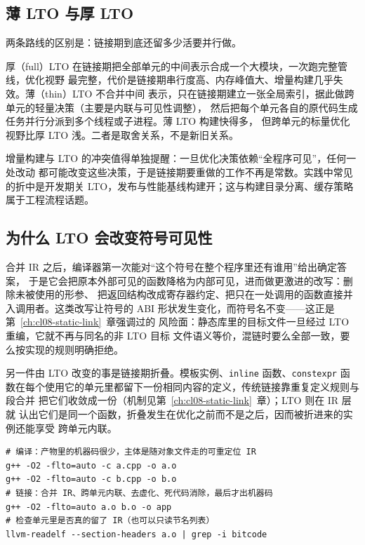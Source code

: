 \documentclass[12pt,a4paper,fontset=fandol]{ctexbook}
\newcommand{\Tp}[1]{\texttt{#1}}
\newcommand{\Mx}[1]{\textsf{#1}}
\begin{document}
\subsection{薄 LTO 与厚 LTO}\label{sec:cl05-thickthin}

两条路线的区别是：链接期到底还留多少活要并行做。

\begin{compare}[title={厚 LTO 与薄 LTO}]
厚（full）LTO 在链接期把全部单元的中间表示合成一个大模块，一次跑完整管线，优化视野
最完整，代价是链接期串行度高、内存峰值大、增量构建几乎失效。薄（thin）LTO 不合并中间
表示，只在链接期建立一张全局索引，据此做跨单元的轻量决策（主要是内联与可见性调整），
然后把每个单元各自的原代码生成任务并行分派到多个线程或子进程。薄 LTO 构建快得多，
但跨单元的标量优化视野比厚 LTO 浅。二者是取舍关系，不是新旧关系。
\end{compare}

增量构建与 \Mx{LTO} 的冲突值得单独提醒：一旦优化决策依赖“全程序可见”，任何一处改动
都可能改变这些决策，于是链接期要重做的工作不再是常数。实践中常见的折中是开发期关
\Mx{LTO}，发布与性能基线构建开；这与构建目录分离、缓存策略属于工程流程话题。

\subsection{为什么 LTO 会改变符号可见性}\label{sec:cl05-symbols}

合并 \Mx{IR} 之后，编译器第一次能对“这个符号在整个程序里还有谁用”给出确定答案，
于是它会把原本外部可见的函数降格为内部可见，进而做更激进的改写：删除未被使用的形参、
把返回结构改成寄存器约定、把只在一处调用的函数直接并入调用者。这类改写让符号的
\Mx{ABI} 形状发生变化，而符号名不变——这正是第~\ref{ch:cl08-static-link}~章强调过的
风险面：静态库里的目标文件一旦经过 \Mx{LTO} 重编，它就不再与同名的非 \Mx{LTO} 目标
文件语义等价，混链时要么全部一致，要么按实现的规则明确拒绝。

另一件由 \Mx{LTO} 改变的事是链接期折叠。模板实例、\Tp{inline} 函数、\Tp{constexpr}
函数在每个使用它的单元里都留下一份相同内容的定义，传统链接靠重复定义规则与段合并
把它们收敛成一份（机制见第~\ref{ch:cl08-static-link}~章）；\Mx{LTO} 则在 \Mx{IR} 层就
认出它们是同一个函数，折叠发生在优化之前而不是之后，因而被折进来的实例还能享受
跨单元内联。

\begin{lstlisting}[style=shellstyle, caption={LTO 的最小链路：编译期留 IR，链接期做优化}]
# 编译：产物里的机器码很少，主体是随对象文件走的可重定位 IR
g++ -O2 -flto=auto -c a.cpp -o a.o
g++ -O2 -flto=auto -c b.cpp -o b.o
# 链接：合并 IR、跨单元内联、去虚化、死代码消除，最后才出机器码
g++ -O2 -flto=auto a.o b.o -o app
# 检查单元里是否真的留了 IR（也可以只读节名列表）
llvm-readelf --section-headers a.o | grep -i bitcode
\end{lstlisting}
\end{document}
